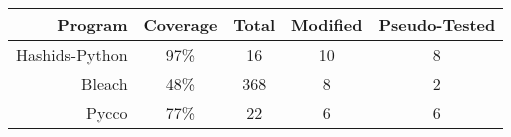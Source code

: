 \renewcommand{\arraystretch}{1.2}

\begin{table}[H]
\centering

%
\huge

\begin{tabular}{rcccc}


  Program & Coverage & Total & Modified & Pseudo-Tested \\
  \toprule

  Hashids-Python & 97\% & 16 & 10 & 8 \\

  Bleach & 48\% & 368 & 8 & 2 \\

  Pycco & 77\% & 22 & 6 & 6 \\








  \bottomrule

\end{tabular}

\end{table}
